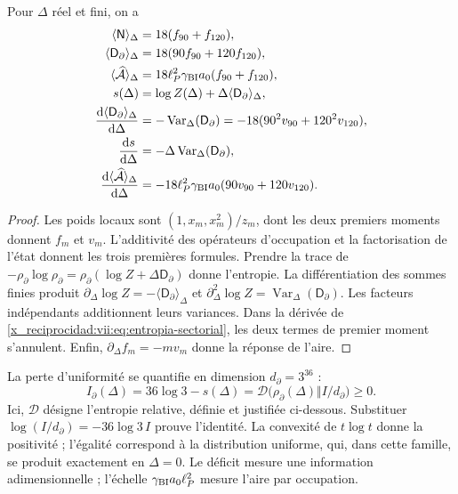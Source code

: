 \begin{proposition}
\label{x_reciprocidad:vii:prop:respuesta-sectorial}
Pour \(\Delta\) réel et fini, on a
\begin{align}
 \langle\mathsf N\rangle_\Delta&=18(f_{90}+f_{120}),\\
 \langle\mathsf D_\partial\rangle_\Delta&=18(90f_{90}+120f_{120}),\\
 \langle\widehat{\mathcal A}\rangle_\Delta
 &=18\ell_P^2\gamma_{\rm BI}a_0(f_{90}+f_{120}),\\
 s(\Delta)&=\log Z(\Delta)+\Delta\langle\mathsf D_\partial\rangle_\Delta,
 \label{x_reciprocidad:vii:eq:entropia-sectorial}\\
 \frac{\mathrm d\langle\mathsf D_\partial\rangle_\Delta}{\mathrm d\Delta}
 &=-\operatorname{Var}_\Delta(\mathsf D_\partial)
  =-18(90^2v_{90}+120^2v_{120}),\\
 \frac{\mathrm ds}{\mathrm d\Delta}
 &=-\Delta\operatorname{Var}_\Delta(\mathsf D_\partial),\\
 \frac{\mathrm d\langle\widehat{\mathcal A}\rangle_\Delta}{\mathrm d\Delta}
 &=-18\ell_P^2\gamma_{\rm BI}a_0(90v_{90}+120v_{120}).
 \label{x_reciprocidad:vii:eq:respuestas-area-entropia}
\end{align}
\end{proposition}
\begin{proof}
Les poids locaux sont \((1,x_m,x_m^2)/z_m\), dont les deux premiers moments donnent \(f_m\) et \(v_m\). L'additivité des opérateurs d'occupation et la factorisation de l'état donnent les trois premières formules. Prendre la trace de \(-\rho_\partial\log\rho_\partial
=\rho_\partial(\log Z+\Delta\mathsf D_\partial)\) donne l'entropie. La différentiation des sommes finies produit \(\partial_\Delta\log Z=-\langle\mathsf D_\partial\rangle_\Delta\) et \(\partial_\Delta^2\log Z
=\operatorname{Var}_\Delta(\mathsf D_\partial)\). Les facteurs indépendants additionnent leurs variances. Dans la dérivée de \eqref{x_reciprocidad:vii:eq:entropia-sectorial}, les deux termes de premier moment s'annulent. Enfin, \(\partial_\Delta f_m=-mv_m\) donne la réponse de l'aire.
\end{proof}

La perte d'uniformité se quantifie en dimension \(d_\partial=3^{36}\) :
\begin{equation}
 I_\partial(\Delta)
 =36\log3-s(\Delta)
 =\mathcal D\bigl(\rho_\partial(\Delta)\Vert I/d_\partial\bigr)\ge0.
 \label{x_reciprocidad:vii:eq:deficit-informacional}
\end{equation}
Ici, \(\mathcal D\) désigne l'entropie relative, définie et justifiée
ci-dessous. Substituer \(\log(I/d_\partial)=-36\log3\,I\) prouve
l'identité. La convexité de \(t\log t\) donne la positivité ; l'égalité
correspond à la distribution uniforme, qui, dans cette famille, se produit
exactement en \(\Delta=0\). Le déficit mesure une information adimensionnelle ;
l'échelle \(\gamma_{\rm BI}a_0\ell_P^2\) mesure l'aire par occupation.

